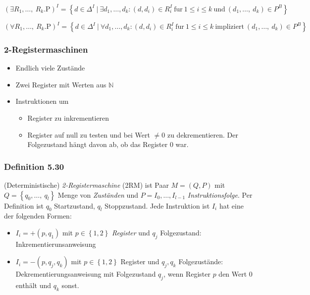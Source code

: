\[\left( \exists R_{1},\ldots,\ R_{k}\text{.P} \right)^{I} = \left\{ d \in \Delta^{I}\ |\ \exists d_{1},\ldots,d_{k}:\left( d,d_{i} \right) \in R_{i}^{I}\ \mathrm{fur}\ 1 \leq i \leq k\ \mathrm{\text{und}}\ \left( d_{1},\ldots,\ d_{k} \right) \in P^{B} \right\}\]

\[\left( \forall R_{1},\ldots,\ R_{k}\text{.P} \right)^{I} = \left\{ d \in \Delta^{I}\ |\ \forall d_{1},\ldots,d_{k}:\left( d,d_{i} \right) \in R_{i}^{I}\ \mathrm{fur}\ 1 \leq i \leq k\ \mathrm{\text{impliziert}}\ \left( d_{1},\ldots,\ d_{k} \right) \in P^{B} \right\}\]

\subsubsection{2-Registermaschinen}\label{registermaschinen}

\begin{itemize}
\item
  Endlich viele Zustände
\item
  Zwei Register mit Werten aus $\mathbb{N}$
\item
  Instruktionen um

  \begin{itemize}
  \item
    Register zu inkrementieren
  \item
    Register auf null zu testen und bei Wert $\neq 0$ zu
    dekrementieren. Der Folgezustand hängt davon ab, ob das Register
    $0$ war.
  \end{itemize}
\end{itemize}

\subsubsection{Definition 5.30}\label{definition-5.30}

(Deterministische) \emph{2-Registermaschine} (2RM) ist Paar
$M = \left( Q,P \right)$ mit
$Q = \left\{ q_{0},\ldots,\ q_{l} \right\}$ Menge von \emph{Zuständen}
und $P = I_{0},\ldots,I_{l - 1}$ \emph{Instruktionsfolge}. Per
Definition ist $q_{0}$ Startzustand, $q_{l}$ Stoppzustand. Jede
Instruktion ist $I_{i}$ hat eine der folgenden Formen:

\begin{itemize}
\item
  $I_{i} = + (p,q_{1})$ mit $p \in \left\{ 1,2 \right\}$
  \emph{Register} und $q_{j}$ Folgezustand: Inkrementierunsanweisung
\item
  $I_{i} = - (p,q_{j},q_{k})$ mit $p \in \left\{ 1,2 \right\}$
  Register und $q_{j},q_{k}$ Folgezustände: Dekrementierungsanweisung
  mit Folgezustand $q_{j}$, wenn Register $p$ den Wert $0$ enthält
  und $q_{k}$ sonst.
\end{itemize}

